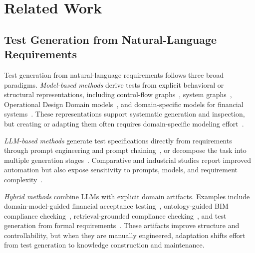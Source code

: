 \section{Related Work}
\label{sec:related_work}


\subsection{Test Generation from Natural-Language Requirements}

Test generation from natural-language requirements follows three broad paradigms. \textit{Model-based methods} derive tests from explicit behavioral or structural representations, including control-flow graphs~\cite{yang2025llmcfg}, system graphs~\cite{zyberaj2025genai}, Operational Design Domain models~\cite{stefani2025automated}, and domain-specific models for financial systems~\cite{jin2019finexpert}. These representations support systematic generation and inspection, but creating or adapting them often requires domain-specific modeling effort~\cite{xue2024domain}.

\textit{LLM-based methods} generate test specifications directly from requirements through prompt engineering and prompt chaining~\cite{masuda2026generating,bhatia2024system,boukhlif2024towards}, or decompose the task into multiple generation stages~\cite{milchevski2025multi}. Comparative and industrial studies report improved automation but also expose sensitivity to prompts, models, and requirement complexity~\cite{hasan2025automatic,korraprolu2025test,wang2025testeval,zhang2024testbench}.

\textit{Hybrid methods} combine LLMs with explicit domain artifacts. Examples include domain-model-guided financial acceptance testing~\cite{xue2024llm4fin}, ontology-guided BIM compliance checking~\cite{chen2024automated}, retrieval-grounded compliance checking~\cite{sun2025compliance}, and test generation from formal requirements~\cite{shrestha2025less}. These artifacts improve structure and controllability, but when they are manually engineered, adaptation shifts effort from test generation to knowledge construction and maintenance.


